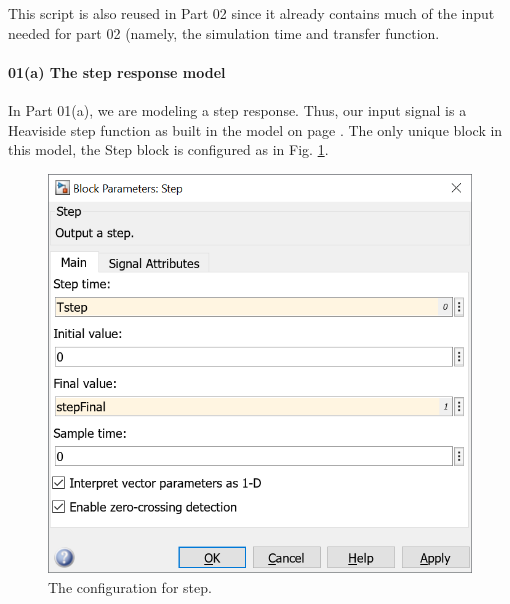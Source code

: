 \documentclass[12pt]{article}
\begin{document}
This script is also reused in Part 02 since it already contains much of the input needed for part 02 (namely, the simulation time and transfer function.

\paragraph{01(a) The step response model}



In Part 01(a), we are modeling a step response. Thus, our input signal is a Heaviside step function as built in
the model on page \pageref{pdf:part01a}.
The only unique block in this model, the Step block is configured as in Fig. \ref{fig:step response model parameters}.


\begin{figure}[h]
    \centering
    \includegraphics[width=(5in/689)*689]{part01a_step_parameters.png}
    \caption{The configuration for step.}
    \label{fig:step response model parameters}
\end{figure}
\end{document}
